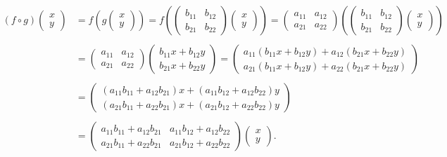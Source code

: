 \documentclass{article}
\begin{document}
\begin{align*}
(f\circ g)\begin{pmatrix} x\\ y \end{pmatrix} &=
f\left(g\begin{pmatrix} x\\ y \end{pmatrix}\right) =
f\left(\begin{pmatrix}
  b_{11} & b_{12} \\
  b_{21} & b_{22}
\end{pmatrix}
\begin{pmatrix}
  x \\ y
\end{pmatrix}\right)
=
\begin{pmatrix}
  a_{11} & a_{12} \\
  a_{21} & a_{22}
\end{pmatrix}
      \left(
\begin{pmatrix}
  b_{11} & b_{12} \\
  b_{21} & b_{22}
\end{pmatrix}
\begin{pmatrix}
  x \\ y
\end{pmatrix}
  \right)\\
  \\
  &= 
\begin{pmatrix}
  a_{11} & a_{12} \\
  a_{21} & a_{22}
\end{pmatrix}
\begin{pmatrix}
  b_{11} x + b_{12} y\\
  b_{21} x + b_{22} y
\end{pmatrix} =
  \begin{pmatrix}
a_{11} (b_{11} x + b_{12} y) + a_{12} (b_{21} x + b_{22} y)\\
a_{21} (b_{11} x + b_{12} y) + a_{22} (b_{21} x + b_{22} y) 
\end{pmatrix}\\
  \\
  &=
  \begin{pmatrix}
(a_{11} b_{11} + a_{12} b_{21}) x + (a_{11}b_{12} + a_{12} b_{22}) y \\ 
(a_{21} b_{11} + a_{22} b_{21}) x + (a_{21} b_{12} + a_{22} b_{22}) y 
\end{pmatrix}\\
  \\
  &=
  \begin{pmatrix}
a_{11} b_{11} + a_{12} b_{21} & a_{11}b_{12} + a_{12} b_{22} \\ 
a_{21} b_{11} + a_{22} b_{21} &  a_{21} b_{12} + a_{22} b_{22} 
\end{pmatrix}
\begin{pmatrix}
  x \\ y
\end{pmatrix}.
\end{align*}
\end{document}
